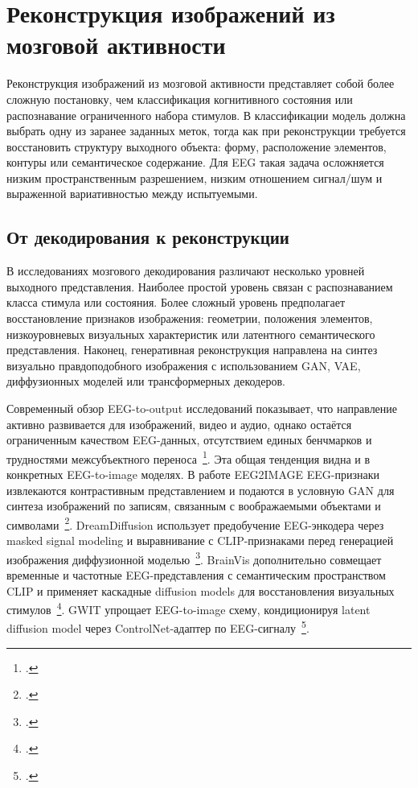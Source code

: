 \section{Реконструкция изображений из мозговой активности}

Реконструкция изображений из мозговой активности представляет собой более сложную постановку, чем классификация когнитивного состояния или распознавание ограниченного набора стимулов. В классификации модель должна выбрать одну из заранее заданных меток, тогда как при реконструкции требуется восстановить структуру выходного объекта: форму, расположение элементов, контуры или семантическое содержание. Для EEG такая задача осложняется низким пространственным разрешением, низким отношением сигнал/шум и выраженной вариативностью между испытуемыми.

\subsection{От декодирования к реконструкции}

В исследованиях мозгового декодирования различают несколько уровней выходного представления. Наиболее простой уровень связан с распознаванием класса стимула или состояния. Более сложный уровень предполагает восстановление признаков изображения: геометрии, положения элементов, низкоуровневых визуальных характеристик или латентного семантического представления. Наконец, генеративная реконструкция направлена на синтез визуально правдоподобного изображения с использованием GAN, VAE, диффузионных моделей или трансформерных декодеров.

Современный обзор EEG-to-output исследований показывает, что направление активно развивается для изображений, видео и аудио, однако остаётся ограниченным качеством EEG-данных, отсутствием единых бенчмарков и трудностями межсубъектного переноса~\footcite{10.48550/arxiv.2412.19999}. Эта общая тенденция видна и в конкретных EEG-to-image моделях. В работе EEG2IMAGE EEG-признаки извлекаются контрастивным представлением и подаются в условную GAN для синтеза изображений по записям, связанным с воображаемыми объектами и символами~\footcite{10.48550/arxiv.2302.10121}. DreamDiffusion использует предобучение EEG-энкодера через masked signal modeling и выравнивание с CLIP-признаками перед генерацией изображения диффузионной моделью~\footcite{10.48550/arxiv.2306.16934}. BrainVis дополнительно совмещает временные и частотные EEG-представления с семантическим пространством CLIP и применяет каскадные diffusion models для восстановления визуальных стимулов~\footcite{10.48550/arxiv.2312.14871}. GWIT упрощает EEG-to-image схему, кондиционируя latent diffusion model через ControlNet-адаптер по EEG-сигналу~\footcite{10.48550/arxiv.2410.02780}.

